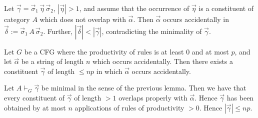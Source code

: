 \proofbeg
Let $\vec{\gamma} = \vec{\sigma}_1 \, \vec{\eta}\, \vec{\sigma}_2$,
$|\vec{\eta}| > 1$, and assume that the occurrence of $\vec{\eta}$
is a constituent of category $A$ which does not overlap with
$\vec{\alpha}$. Then $\vec{\alpha}$ occurs accidentally in
$\vec{\delta} := \vec{\sigma}_1\, A\, \vec{\sigma}_2$. Further,
$|\vec{\delta}| < |\vec{\gamma}|$, contradicting the minimality of
$\vec{\gamma}$.
\proofend
\begin{lem}
\label{lem:akz}
Let $G$ be a CFG where the productivity of rules
is at least 0 and at most $p$, and let $\vec{\alpha}$
be a string of length $n$ which occurs accidentally.
Then there exists a constituent $\vec{\gamma}$
of length $\leq n p$ in which $\vec{\alpha}$ occurs accidentally.
\end{lem}
\proofbeg
Let $A \vdash_G \vec{\gamma}$ be minimal in the sense of the previous
lemma. Then we have that every constituent of $\vec{\gamma}$
of length $> 1$ overlaps properly with $\vec{\alpha}$. Hence
$\vec{\gamma}$ has been obtained by at most $n$ applications
of rules of productivity $> 0$. Hence $|\vec{\gamma}| \leq n p$.
\proofend

